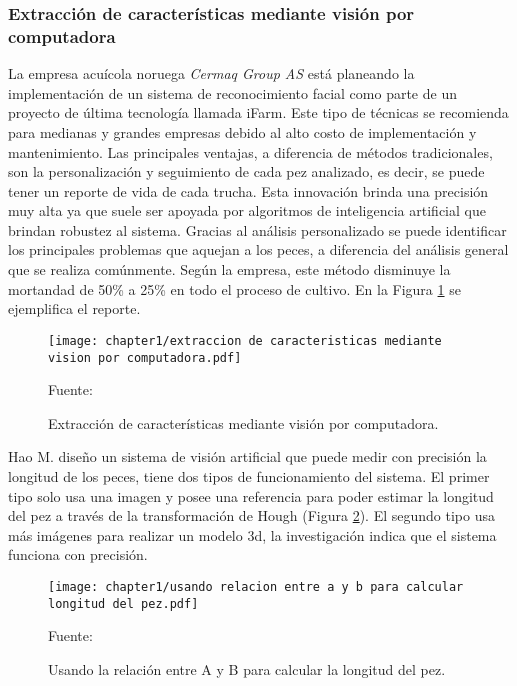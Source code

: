 \subsubsection{Extracción de características mediante visión por computadora}

La empresa acuícola noruega \textit{Cermaq Group AS} está planeando la implementación de un sistema de reconocimiento facial como parte de un proyecto de última tecnología llamada iFarm.\citep{Daley2018} Este tipo de técnicas se recomienda para medianas y grandes empresas debido al alto costo de implementación y mantenimiento. Las principales ventajas, a diferencia de métodos tradicionales, son la personalización y seguimiento de cada pez analizado, es decir, se puede tener un reporte de vida de cada trucha. Esta innovación brinda una precisión muy alta ya que suele ser apoyada por algoritmos de inteligencia artificial que brindan robustez al sistema. Gracias al análisis personalizado se puede identificar los principales problemas que aquejan a los peces, a diferencia del análisis general que se realiza comúnmente. Según la empresa, este método disminuye la mortandad de 50\% a 25\% en todo el proceso de cultivo. En la Figura \ref{fig:extraccion de caracteristicas mediante vision por computadora} se ejemplifica el reporte.

\begin{figure}[H]
	\centering
	\texttt{[image: chapter1/extraccion de caracteristicas mediante vision por computadora.pdf]}
	\caption{Extracción de características mediante visión por computadora.}
	\begin{myflushleftportland}
		Fuente: \citep{Biosort2016}
	\end{myflushleftportland}
	\label{fig:extraccion de caracteristicas mediante vision por computadora}
\end{figure}

Hao M. diseño un sistema de visión artificial que puede medir con precisión la longitud de los peces, tiene dos tipos de funcionamiento del sistema. El primer tipo solo usa una imagen y posee una referencia para poder estimar la longitud del pez a través de la transformación de Hough (Figura \ref{fig:usando relacion entre a y b para calcular longitud del pez}). El segundo tipo usa más imágenes para realizar un modelo 3d, la investigación indica que el sistema funciona con precisión. \citep[p.~4-5]{Niu2018}

\begin{figure}[H]
	\centering
	\texttt{[image: chapter1/usando relacion entre a y b para calcular longitud del pez.pdf]}
	\caption{Usando la relación  entre A y B para calcular la longitud del pez.}
	\begin{myflushleftportland}
		Fuente: \citep{Hao2016}
	\end{myflushleftportland}
	\label{fig:usando relacion entre a y b para calcular longitud del pez}
\end{figure}

